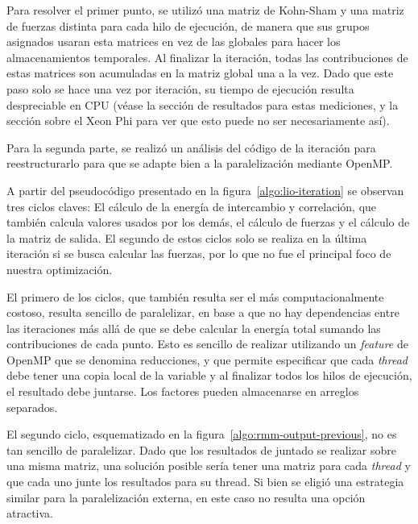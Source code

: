 Para resolver el primer punto, se utiliz\'o una matriz de Kohn-Sham y una matriz de
fuerzas distinta para cada hilo de ejecuci\'on, de manera que sus grupos asignados
usaran esta matrices en vez de las globales para hacer los almacenamientos temporales.
Al finalizar la iteraci\'on, todas
las contribuciones de estas matrices son acumuladas en la matriz global una a la
vez. Dado que este paso solo se hace una vez por iteraci\'on, su tiempo de ejecuci\'on resulta
despreciable en CPU (v\'ease la secci\'on de resultados para estas mediciones, y
la secci\'on sobre el Xeon Phi para ver que esto puede no ser necesariamente as\'i).



Para la segunda parte, se realiz\'o un an\'alisis del c\'odigo de la iteraci\'on para
reestructurarlo para que se adapte bien a la paralelizaci\'on mediante OpenMP.

A partir del pseudoc\'odigo presentado en la figura~\ref{algo:lio-iteration} se observan
tres ciclos claves: El c\'alculo de la energ\'ia de intercambio y
correlaci\'on, que tambi\'en calcula valores usados por los dem\'as, el
c\'alculo de fuerzas y el c\'alculo de la matriz de salida. El segundo de estos
ciclos solo se realiza en la \'ultima iteraci\'on si se busca calcular las fuerzas,
por lo que no fue el principal foco de nuestra optimizaci\'on.

El primero de los ciclos, que tambi\'en resulta ser el m\'as computacionalmente
costoso, resulta sencillo de paralelizar, en base a que no hay dependencias entre
las iteraciones m\'as all\'a de que se debe calcular la energ\'ia total sumando
las contribuciones de cada punto. Esto es sencillo de realizar utilizando un
\textit{feature} de OpenMP que se denomina reducciones, y que permite especificar
que cada \textit{thread} debe tener una copia local de la variable y al finalizar
todos los hilos de ejecuci\'on, el resultado debe juntarse. Los factores pueden
almacenarse en arreglos separados.

El segundo ciclo, esquematizado en la figura~\ref{algo:rmm-output-previous}, no es tan
sencillo de paralelizar. Dado que los resultados de juntado se realizar sobre
una misma matriz, una soluci\'on posible ser\'ia tener una matriz para cada
\textit{thread} y que cada uno junte los resultados para su thread. Si bien se
eligi\'o una estrategia similar para la paralelizaci\'on externa, en este caso no
resulta una opci\'on atractiva.

